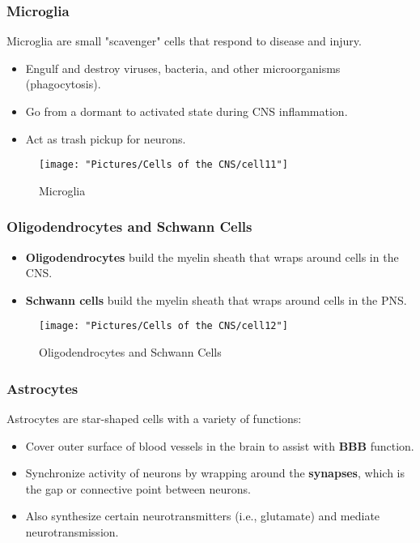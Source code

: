 \documentclass[12pt,a4paper]{article}
\begin{document}
	
	\subsubsection{Microglia}
	
	Microglia are small "scavenger" cells that respond to disease and injury.
	
	\begin{itemize}
		\item Engulf and destroy viruses, bacteria, and other microorganisms (phagocytosis).
		\item Go from a dormant to activated state during CNS inflammation. 
		\item Act as trash pickup for neurons. 
	\end{itemize}
	
\begin{figure}
	\centering
	\texttt{[image: "Pictures/Cells of the CNS/cell11"]}
	\caption{Microglia}
	\label{fig:cell11}
\end{figure}
	
	
	\subsubsection{Oligodendrocytes and Schwann Cells}
	
	\begin{itemize}
		\item \textbf{Oligodendrocytes} build the myelin sheath that wraps around cells in the CNS. 
		\item \textbf{Schwann cells} build the myelin sheath that wraps around cells in the PNS. 
	\end{itemize}
	
	
\begin{figure}
	\centering
	\texttt{[image: "Pictures/Cells of the CNS/cell12"]}
	\caption{Oligodendrocytes and Schwann Cells}
	\label{fig:cell12}
\end{figure}
	
	\subsubsection{Astrocytes}
	
	Astrocytes are star-shaped cells with a variety of functions:
	
	\begin{itemize}
		\item Cover outer surface of blood vessels in the brain to assist with \textbf{BBB} function. 
		\item Synchronize activity of neurons by wrapping around the \textbf{synapses}, which is the gap or connective point between neurons. 
		\item Also synthesize certain neurotransmitters (i.e., glutamate) and mediate neurotransmission. 
	\end{itemize}
	
\end{document}
